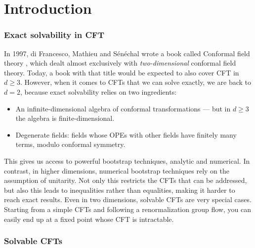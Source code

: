 \documentclass[12pt, a4paper]{article}
\theoremstyle{break}
\begin{document}
\section{Introduction}

\subsubsection*{Exact solvability in CFT}

In 1997, di Francesco, Mathieu and Sénéchal wrote a book called Conformal field theory \cite{fms97}, which dealt almost exclusively with \textit{two-dimensional} conformal field theory. Today, a book with that title would be expected to also cover CFT in $d\geq 3$. However, when it comes to CFTs that we can solve exactly, we are back to $d=2$, because exact solvability relies on two ingredients:
\begin{itemize}
 \item An infinite-dimensional algebra of conformal transformations --- but in $d\geq 3$ the algebra is finite-dimensional. 
 \item Degenerate fields: fields whose OPEs with other fields have finitely many terms, modulo conformal symmetry. 
\end{itemize}
This gives us access to powerful bootstrap techniques, analytic and numerical. In contrast, in higher dimensions, numerical bootstrap techniques rely on the assumption of unitarity. Not only this restricts the CFTs that can be addressed, but also this leads to inequalities rather than equalities, making it harder to reach exact results. 
Even in two dimensions, solvable CFTs are very special cases. Starting from a simple CFTs and following a renormalization group flow, you can easily end up at a fixed point whose CFT is intractable. 

\subsubsection*{Solvable CFTs}
\end{document}
